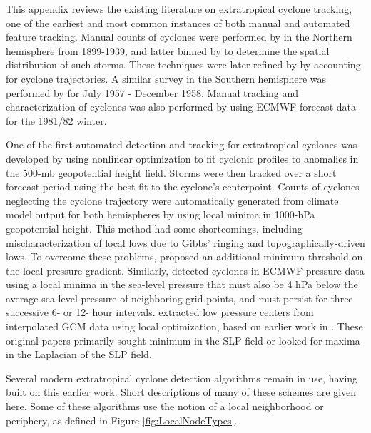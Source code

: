 \documentclass[gmdd, hvmath]{copernicus}
\begin{document}
This appendix reviews the existing literature on extratropical cyclone tracking, one of the earliest and most common instances of both manual and automated feature tracking.  Manual counts of cyclones were performed by \cite{petterssen1956weather} in the Northern hemisphere from 1899-1939, and latter binned by \cite{klein1957principle} to determine the spatial distribution of such storms.  These techniques were later refined by \cite{whittaker1982atlas} by accounting for cyclone trajectories.  A similar survey in the Southern hemisphere was performed by \cite{taljaard1967development} for July 1957 - December 1958.  Manual tracking and characterization of cyclones was also performed by \cite{akyildiz1985systematic} using ECMWF forecast data for the 1981/82 winter.

One of the first automated detection and tracking for extratropical cyclones was developed by \cite{williamson1981storm} using nonlinear optimization to fit cyclonic profiles to anomalies in the 500-mb geopotential height field.  Storms were then tracked over a short forecast period using the best fit to the cyclone's centerpoint.  Counts of cyclones neglecting the cyclone trajectory were automatically generated from climate model output for both hemispheres by \cite{lambert1988cyclone} using local minima in 1000-hPa geopotential height.  This method had some shortcomings, including mischaracterization of local lows due to Gibbs' ringing and topographically-driven lows.  To overcome these problems, \cite{alpert1990climatological} proposed an additional minimum threshold on the local pressure gradient.  Similarly, \cite{le1990comparison} detected cyclones in ECMWF pressure data using a local minima in the sea-level pressure that must also be 4 hPa below the average sea-level pressure of neighboring grid points, and must persist for three successive 6- or 12- hour intervals.  \cite{murray1991numerical} extracted low pressure centers from interpolated GCM data using local optimization, based on earlier work in \cite{rice1982durivation}.  These original papers primarily sought minimum in the SLP field or looked for maxima in the Laplacian of the SLP field.

Several modern extratropical cyclone detection algorithms remain in use, having built on this earlier work.  Short descriptions of many of these schemes are given here.  Some of these algorithms use the notion of a local neighborhood or periphery, as defined in Figure \ref{fig:LocalNodeTypes}.
\end{document}
